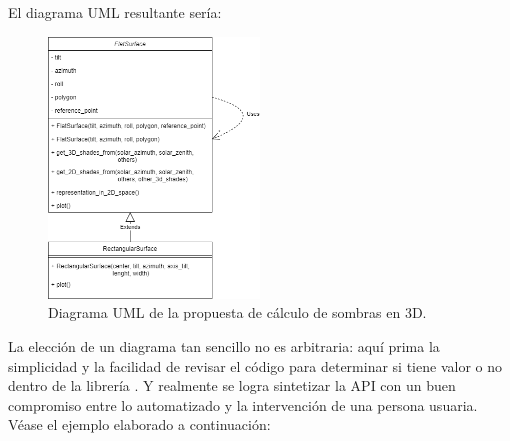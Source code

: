 El diagrama UML resultante sería:

\begin{figure}[H]
    \centering
    \includegraphics[width=0.5\textwidth]{./images/shading_3d/shading_classes.png}
    \caption{Diagrama UML de la propuesta de cálculo de sombras en 3D.}
    \label{fig:uml_sombreado}
\end{figure}

La elección de un diagrama tan sencillo no es arbitraria: aquí prima la simplicidad y la facilidad de revisar el código para determinar si tiene valor o no dentro de la librería \pvlibpy{}. Y realmente se logra sintetizar la \gls{API} con un buen compromiso entre lo automatizado y la intervención de una persona usuaria. Véase el ejemplo elaborado a continuación:

